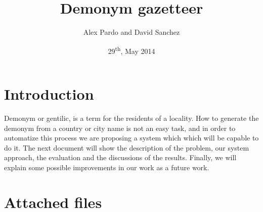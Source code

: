 \documentclass[]{article}
\title{Demonym gazetteer}
\date{29\textsuperscript{th}, May 2014}
\author{Alex Pardo and David Sanchez}
\begin{document}
\maketitle
\newpage
\tableofcontents

\newpage

\section{Introduction}

Demonym or gentilic, is a term for the residents of a locality. 
How to generate the demonym from a country or city name is not an easy task, and in order to automatize this process we are proposing a system which which will be capable to do it. 
The next document will show the description of the problem, our system approach, the evaluation and the discussions of the results. Finally, we will explain some possible improvements in our work as a future work.

\section{Attached files}
\end{document}
